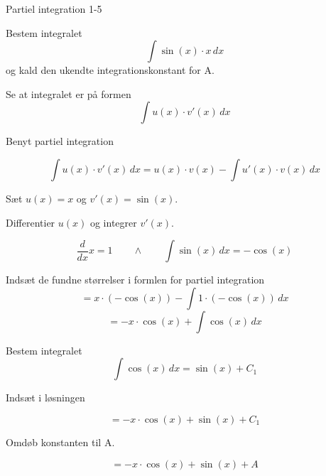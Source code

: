 \documentclass{article}
\begin{document}
\begin{exercise}{Partiel integration 1-5}
	
	
	Bestem integralet
	\[
	\int \sin(x) \cdot x \, dx
	\]
	og kald den ukendte integrationskonstant for A.
	
	
	
	\hint
	
	Se at integralet er på formen
	\[
	\int u(x) \cdot v'(x) \, dx
	\]
	
	\hint
	
	Benyt partiel integration
	
	\hint
	\[
	\int u(x) \cdot v'(x)\, dx = u(x) \cdot v(x) - \int u'(x) \cdot v(x) \, dx
	\]
	\hint
	
	Sæt $u(x) = x$ og $v'(x) = \sin(x)$.
	
	
	\hint
	
	Differentier $u(x)$ og integrer $v'(x)$.
	
	\hint
	\[
	\frac{d}{dx}x = 1 \qquad \wedge \qquad \int \sin(x) \, dx = -\cos(x)
	\]
	
	\hint
	
	Indsæt de fundne størrelser i formlen for partiel integration
	\[
	= x \cdot (-\cos(x))- \int 1 \cdot (-\cos(x)) \, dx
	\]
	\[
	= -x \cdot \cos(x)+ \int \cos(x) \, dx 
	\]
	
	\hint
	
	Bestem integralet
	\[
	\int \cos(x) \, dx = \sin(x) + C_1
	\]
	
	\hint
	Indsæt i løsningen 
	
	\hint
	
	\[
	= -x \cdot \cos(x) + \sin(x) + C_1
	\]
	
	\hint
	
	Omdøb konstanten til A.
	
	\hint
	
	\[
	= -x \cdot \cos(x) + \sin(x) + A
	\]
	
	
\end{exercise}

\newpage
\end{document}
